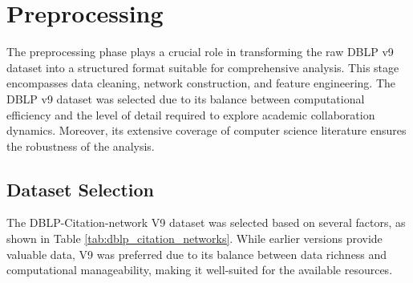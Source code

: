 \documentclass[11pt]{article}
\begin{document}
\section{Preprocessing}

The preprocessing phase plays a crucial role in transforming the raw DBLP v9 dataset into a structured format suitable for comprehensive analysis. This stage encompasses data cleaning, network construction, and feature engineering. The DBLP v9 dataset was selected due to its balance between computational efficiency and the level of detail required to explore academic collaboration dynamics. Moreover, its extensive coverage of computer science literature ensures the robustness of the analysis.

\subsection{Dataset Selection}

The DBLP-Citation-network V9 dataset was selected based on several factors, as shown in Table \ref{tab:dblp_citation_networks}. While earlier versions provide valuable data, V9 was preferred due to its balance between data richness and computational manageability, making it well-suited for the available resources.
\end{document}
